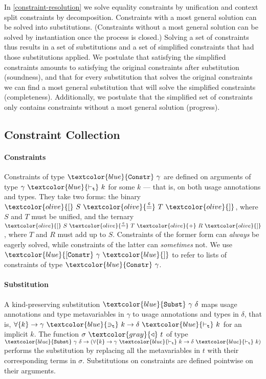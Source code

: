 \documentclass[sigplan,screen,review]{acmart}
\theoremstyle{definition}\newtheorem{mytheorem}{Theorem}[section]
\newcommand{\constr}[1]{\textcolor{olive}{\mathtt{#1}}}
\newcommand{\func}[1]{\textcolor{gray}{\mathtt{#1}}}
\newcommand{\type}[1]{\textcolor{blue}{\mathtt{#1}}}
\newcommand{\tvar}[2]{#1 ~\type{\ni_t}~ #2}
\newcommand{\tkind}[2]{#1 ~\type{\vdash_t}~ #2}
\newcommand{\tConstr}[1]{\type{Constr} ~ #1}
\newcommand{\tConstrs}[1]{\type{[Constr} ~ #1 ~ \type{]}}
\newcommand{\subst}[2]{#1 ~ \func{\triangleleft} ~ #2}
\newcommand{\tSubst}[2]{\type{Subst}~#1~#2}
\newcommand{\eqconstr}[2]{\constr{[} ~ #1 ~ \constr{\stackrel{c}{=}} ~ #2 ~ \constr{]}}
\newcommand{\sumconstr}[3]{\constr{[} ~ #1 ~ \constr{\stackrel{c}{=}} ~ #2 ~ \constr{+} ~ #3 ~ \constr{]}}
\begin{document}
In \autoref{constraint-resolution} we solve equality constraints by unification and context split constraints by decomposition.
Constraints with a most general solution can be solved into substitutions.
(Constraints without a most general solution can be solved by instantiation once the process is closed.)
Solving a set of constraints thus results in a set of substitutions and a set of simplified constraints that had those substitutions applied.
We postulate that satisfying the simplified constraints amounts to satisfying the original constraints after substitution (soundness), and that for every substitution that solves the original constraints we can find a most general substitution that will solve the simplified constraints (completeness).
Additionally, we postulate that the simplified set of constraints only contains constraints without a most general solution (progress).

\subsection{Constraint Collection}
\label{constraint-collection}

\paragraph{Constraints}

Constraints of type $\tConstr{\gamma}$ are defined on arguments of type $\tkind{\gamma}{k}$ for some $k$ --- that is, on both usage annotations and types.
They take two forms: the binary $\eqconstr{S}{T}$, where $S$ and $T$ must be unified, and the ternary $\sumconstr{S}{T}{R}$, where $T$ and $R$ must add up to $S$.
Constraints of the former form can \emph{always} be eagerly solved, while constraints of the latter can \emph{sometimes} not.
We use $\tConstrs{\gamma}$ to refer to lists of constraints of type $\tConstr{\gamma}$.

\paragraph{Substitution}

A kind-preserving substitution $\tSubst{\gamma}{\delta}$ maps usage annotations and type metavariables in $\gamma$ to usage annotations and types in $\delta$, that is, $\forall \{k\} \to \tvar{\gamma}{k} \to \tkind{\delta}{k}$ for an implicit $k$.
The function $\subst{\sigma}{t}$ of type $\tSubst{\gamma}{\delta} \to (\forall \{k\} \to \tkind{\gamma}{k} \to \tkind{\delta}{k})$ performs the substitution by replacing all the metavariables in $t$ with their corresponding terms in $\sigma$.
Substitutions on constraints are defined pointwise on their arguments.
\end{document}
